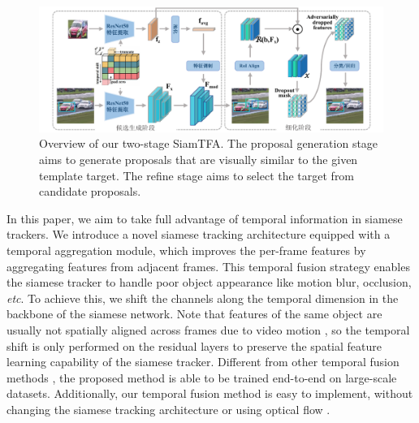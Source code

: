 \begin{figure}[t]
    \centering
    \includegraphics[width=1.0\textwidth]{Img/end/net_v3.pdf}
    \caption{
    Overview of our two-stage SiamTFA.
    The proposal generation stage aims to generate proposals that are visually similar to the given template target. The refine stage aims to select the target from candidate proposals.}
    \label{fig:SiamTFA}
\end{figure}

In this paper, we aim to take full advantage of temporal information in siamese trackers.
We introduce a novel siamese tracking architecture equipped with a temporal aggregation module, which improves the per-frame features by aggregating features from adjacent frames.
This temporal fusion strategy enables the siamese tracker to handle poor object appearance like motion blur, occlusion, \textit{etc}.
To achieve this, we shift the channels along the temporal dimension \cite{lin2019tsm} in the backbone of the siamese network.
Note that features of the same object are usually not spatially aligned across frames due to video motion \cite{zhu2017flow}, so the temporal shift is only performed on the residual layers \cite{lin2019tsm} to preserve the spatial feature learning capability of the siamese tracker.
Different from other temporal fusion methods \cite{tao2016siamese, gladh2016deep}, the proposed method is able to be trained end-to-end on large-scale datasets.
Additionally, our temporal fusion method is easy to implement, without changing the siamese tracking architecture or using optical flow \cite{FlowTrack}.

